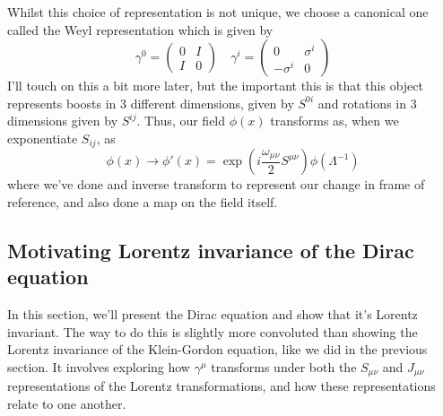 \documentclass[11pt, oneside]{article}   	%
\theoremstyle{newline}
\theoremstyle{newline}
\theoremstyle{newline}
\theoremstyle{newline}
\theoremstyle{newline}
\begin{document}
Whilst this choice of representation is not unique, we choose a canonical one called the Weyl representation which is given by
\[ \gamma^0 = \begin{pmatrix} 0  & I \\ I & 0 \end{pmatrix} \quad \gamma^i = \begin{pmatrix} 0 & \sigma^{i} \\ - \sigma^i & 0 \end{pmatrix} \]  
I'll touch on this a bit more later, but the important this is that this object represents boosts in 3 different dimensions, given by $S^{0i}$ and rotations in 3 dimensions given by $S^{ij}$. 
Thus, our field $\phi(x)$ transforms as, when we exponentiate $S_{ij}$, as \[ \phi(x) \rightarrow \phi'(x) = \exp(i \frac{\omega_{\mu\nu}}{2} S^{\mu\nu}) \phi(\Lambda^{-1}) \] where we've done and inverse transform to represent our change in frame of reference, and also done a map on the field itself.  

\subsection{Motivating Lorentz invariance of the Dirac equation}
In this section, we'll present the Dirac equation and show that it's Lorentz invariant. The way to do this is slightly more convoluted than showing the Lorentz invariance of the Klein-Gordon equation, like we did in the previous section. It involves exploring how $\gamma^\mu$ transforms under both the $S_{ \mu \nu } $ and $ J_{ \mu \nu} $ representations of the Lorentz transformations, and how these representations relate to one another. 
\end{document}
